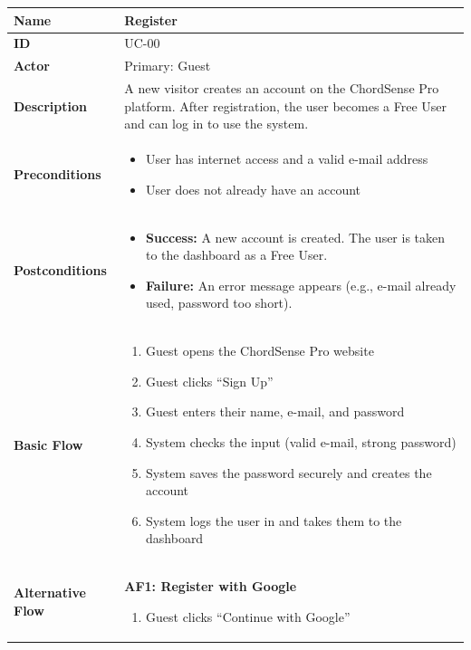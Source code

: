 \documentclass[a4paper]{article}
\newlength{\ucLeft}
\begin{document}
\begin{longtable}{|>{\bfseries}p{\ucLeft}|p{\dimexpr\linewidth-\ucLeft-2\tabcolsep-2\arrayrulewidth}|}
\hline
Name & Register \\ \hline
ID & UC-00 \\ \hline
Actor & Primary: Guest \\ \hline
Description & A new visitor creates an account on the ChordSense Pro platform. After registration, the user becomes a Free User and can log in to use the system. \\ \hline
Preconditions &
\begin{itemize}[leftmargin=1em, nosep, topsep=2pt, partopsep=0pt, parsep=0pt, after=\strut]
    \item User has internet access and a valid e-mail address
    \item User does not already have an account
\end{itemize}
\\ \hline
Postconditions &
\begin{itemize}[leftmargin=1em, nosep, topsep=2pt, partopsep=0pt, parsep=0pt, after=\strut]
    \item \textbf{Success:} A new account is created. The user is taken to the dashboard as a Free User.
    \item \textbf{Failure:} An error message appears (e.g., e-mail already used, password too short).
\end{itemize}
\\ \hline
Basic Flow &
\begin{enumerate}[leftmargin=1.5em, nosep, topsep=2pt, partopsep=0pt, parsep=0pt, after=\strut]
    \item Guest opens the ChordSense Pro website
    \item Guest clicks ``Sign Up''
    \item Guest enters their name, e-mail, and password
    \item System checks the input (valid e-mail, strong password)
    \item System saves the password securely and creates the account
    \item System logs the user in and takes them to the dashboard
\end{enumerate}
\\ \hline
Alternative Flow &
\textbf{AF1: Register with Google}
\begin{enumerate}[leftmargin=1.5em, nosep, topsep=2pt, partopsep=0pt, parsep=0pt, after=\strut]
    \item Guest clicks ``Continue with Google''

\end{enumerate}
\end{longtable}
\end{document}
